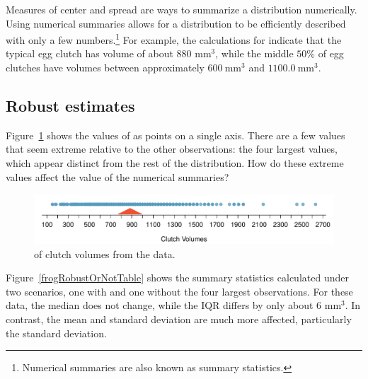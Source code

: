 Measures of center and spread are ways to summarize a distribution numerically. Using numerical summaries allows for a distribution to be efficiently described with only a few numbers.\footnote{Numerical summaries are also known as summary statistics.} For example, the calculations for  indicate that the typical egg clutch has volume of about 880 mm$^3$, while the middle $50\%$ of egg clutches have volumes between approximately $600\ \textrm{mm}^{3}$ and $1100.0\ \textrm{mm}^{3}$.
\textD{\\[5mm]}


\subsection{Robust estimates}

Figure~\ref{frogClutchVolDotPlot} shows the values of  as points on a single axis. There are a few values that seem extreme relative to the other observations: the four largest values, which appear distinct from the rest of the distribution. How do these extreme values affect the value of the numerical summaries?

\begin{figure}[ht]
	\centering
	\includegraphics[width=\textwidth]{ch_intro_to_data_oi_biostat/figures/frogClutchVolDotPlot/frogClutchVolDotPlot}
    \caption{ of clutch volumes from the  data.}
	\label{frogClutchVolDotPlot}
\end{figure}

Figure~\ref{frogRobustOrNotTable} shows the summary statistics calculated under two scenarios, one with and one without the four largest observations. For these data, the median does not change, while the IQR differs by only about 6 $\textrm{mm}^{3}$. In contrast, the mean and standard deviation are much more affected, particularly the standard deviation.

